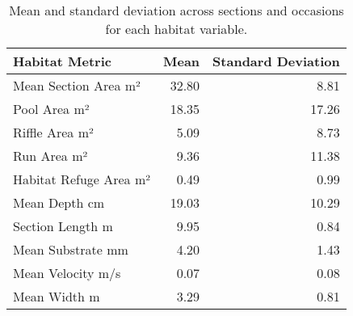 \begin{table}[ht]
\centering
\caption{Mean and standard deviation across sections and occasions for each habitat variable.} 
\label{tab:habitat}
\begin{tabular}{lrr}
  \hline
Habitat Metric & Mean & Standard Deviation \\ 
  \hline
Mean Section Area m² & 32.80 & 8.81 \\ 
  Pool Area m² & 18.35 & 17.26 \\ 
  Riffle Area m² & 5.09 & 8.73 \\ 
  Run Area m² & 9.36 & 11.38 \\ 
  Habitat Refuge Area m² & 0.49 & 0.99 \\ 
  Mean Depth cm & 19.03 & 10.29 \\ 
  Section Length m & 9.95 & 0.84 \\ 
  Mean Substrate mm & 4.20 & 1.43 \\ 
  Mean Velocity m/s & 0.07 & 0.08 \\ 
  Mean Width m & 3.29 & 0.81 \\ 
   \hline
\end{tabular}
\end{table}
